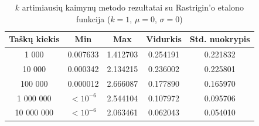 \begin{table}[H]
    \centering
    \begin{tabular}{|c|c|c|c|c|}
        \hline
        \textbf{Taškų kiekis} & \textbf{Min} & \textbf{Max} & \textbf{Vidurkis} & \textbf{Std. nuokrypis} \\ \hline
        1 000        & 0.007633 & 1.412703 & 0.254191 & 0.221832 \\ \hline
        10 000       & 0.000342 & 2.134215 & 0.236002 & 0.225801 \\ \hline
        100 000      & 0.000012 & 2.666087 & 0.177890 & 0.165970 \\ \hline
        1 000 000    & $<10^{-6}$ & 2.544104 & 0.107972 & 0.095706 \\ \hline
        10 000 000   & $<10^{-6}$ & 2.063461 & 0.062043 & 0.054010 \\ \hline
    \end{tabular}
    \caption{$k$ artimiausių kaimynų metodo rezultatai su Rastrigin'o etalono funkcija ($k = 1$, $\mu = 0$, $\sigma = 0$)}
\end{table}